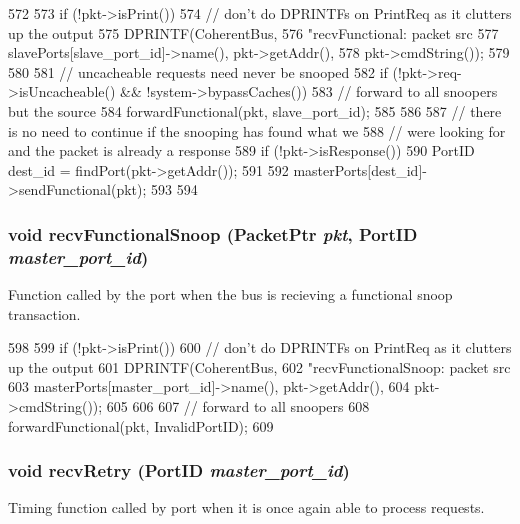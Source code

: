 \begin{DoxyCode}
572 {
573     if (!pkt->isPrint()) {
574         // don't do DPRINTFs on PrintReq as it clutters up the output
575         DPRINTF(CoherentBus,
576                 "recvFunctional: packet src %
577                 slavePorts[slave_port_id]->name(), pkt->getAddr(),
578                 pkt->cmdString());
579     }
580 
581     // uncacheable requests need never be snooped
582     if (!pkt->req->isUncacheable() && !system->bypassCaches()) {
583         // forward to all snoopers but the source
584         forwardFunctional(pkt, slave_port_id);
585     }
586 
587     // there is no need to continue if the snooping has found what we
588     // were looking for and the packet is already a response
589     if (!pkt->isResponse()) {
590         PortID dest_id = findPort(pkt->getAddr());
591 
592         masterPorts[dest_id]->sendFunctional(pkt);
593     }
594 }
\end{DoxyCode}
\hypertarget{classCoherentBus_aab366eefcf6b389a308a63c82e7b3116}{
\subsubsection[{recvFunctionalSnoop}]{\setlength{\rightskip}{0pt plus 5cm}void recvFunctionalSnoop ({\bf PacketPtr} {\em pkt}, \/  {\bf PortID} {\em master\_\-port\_\-id})}}
\label{classCoherentBus_aab366eefcf6b389a308a63c82e7b3116}
Function called by the port when the bus is recieving a functional snoop transaction. 


\begin{DoxyCode}
598 {
599     if (!pkt->isPrint()) {
600         // don't do DPRINTFs on PrintReq as it clutters up the output
601         DPRINTF(CoherentBus,
602                 "recvFunctionalSnoop: packet src %
603                 masterPorts[master_port_id]->name(), pkt->getAddr(),
604                 pkt->cmdString());
605     }
606 
607     // forward to all snoopers
608     forwardFunctional(pkt, InvalidPortID);
609 }
\end{DoxyCode}
\hypertarget{classCoherentBus_a96f9cd33bfb9a8b7fb2b25078eaf75a1}{
\subsubsection[{recvRetry}]{\setlength{\rightskip}{0pt plus 5cm}void recvRetry ({\bf PortID} {\em master\_\-port\_\-id})}}
\label{classCoherentBus_a96f9cd33bfb9a8b7fb2b25078eaf75a1}
Timing function called by port when it is once again able to process requests. 


